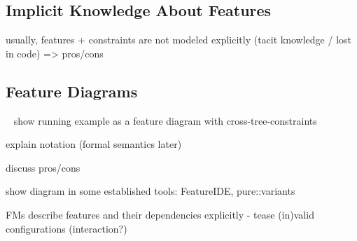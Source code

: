 

\subsection{Implicit Knowledge About Features}

usually, features + constraints are not modeled explicitly (tacit knowledge / lost in code) => pros/cons








\subsection{Feature Diagrams} %

\begin{frame}{~}
show running example as a feature diagram with cross-tree-constraints

explain notation (formal semantics later)

discuss pros/cons

show diagram in some established tools: FeatureIDE, pure::variants

FMs describe features and their dependencies explicitly - tease (in)valid configurations (interaction?)
\end{frame}
